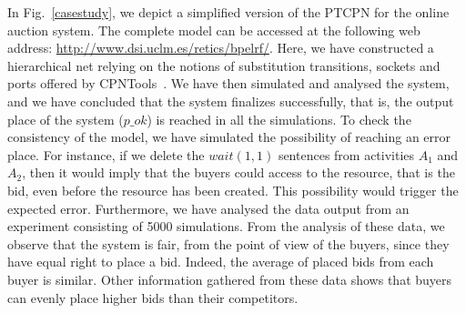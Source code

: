 In Fig.~\ref{casestudy}, we depict a simplified version of the PTCPN for the online auction system. The complete model can be accessed at the following web address: \url{http://www.dsi.uclm.es/retics/bpelrf/}. Here, we have constructed a hierarchical net relying on the notions of substitution transitions, sockets and ports offered by CPNTools~\cite{Jensen2009}. 
We have then simulated and analysed the system, and we have concluded that the system finalizes successfully, that is, the output place of the system ($p\_ok$) is reached in all the simulations. To check the consistency of the model, we have simulated the possibility of reaching an error place. For instance, if we delete the $wait(1,1)$ sentences from activities $A_1$ and $A_2$, then it would imply that the buyers could access to the resource, that is the bid, even before the resource has been created. This possibility would trigger the expected error. Furthermore, we have analysed the data output from an experiment consisting of 5000 simulations. From the analysis of these data, we observe that the system is fair, from the point of view of the buyers, since they have equal right to place a bid. Indeed, the average of placed bids from each buyer is similar. Other information gathered from these data shows that buyers can evenly place higher bids than their competitors. %


